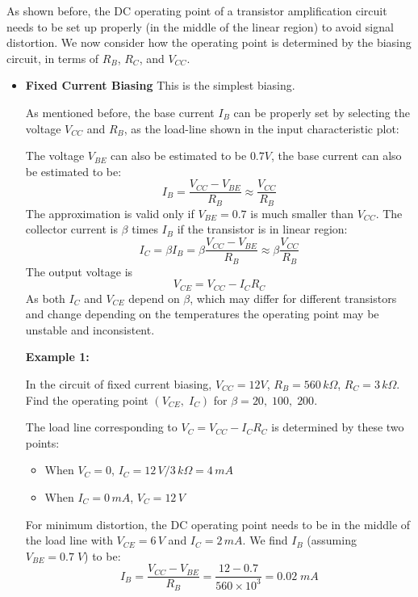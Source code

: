 As shown before, the DC operating point of a transistor amplification circuit
needs to be set up properly (in the middle of the linear region) to avoid
signal distortion. We now consider how the operating point is determined by 
the biasing circuit, in terms of $R_B$, $R_C$, and $V_{CC}$.

\begin{itemize}
\item {\bf Fixed Current Biasing} This is the simplest biasing. 


As mentioned before, the base current $I_B$ can be properly set by selecting
the voltage $V_{CC}$ and $R_B$, as the load-line shown in the input 
characteristic plot: 


The voltage $V_{BE}$ can also be estimated to be $0.7V$, the base current can 
also be estimated to be:
\[
I_B=\frac{V_{CC}-V_{BE}}{R_B} \approx \frac{V_{CC}}{R_B}	
\]
The approximation is valid only if $V_{BE}=0.7$ is much smaller than $V_{CC}$.
The collector current is $\beta$ times $I_B$ if the transistor is in linear
region:
\[
I_C=\beta I_B=\beta \frac{V_{CC}-V_{BE}}{R_B} \approx \beta \frac{V_{CC}}{R_B}
\]
The output voltage is 
\[
V_{CE}=V_{CC}-I_C R_C	
\]
As both $I_C$ and $V_{CE}$ depend on $\beta$, which may differ for different
transistors and change depending on the temperatures the operating point may
be unstable and inconsistent. 

{\bf Example 1:} 

In the circuit of fixed current biasing, $V_{CC}=12V$, $R_B=560\,k\Omega$, 
$R_C=3\,k\Omega$. Find the operating point $(V_{CE},\;I_C)$ for $\beta=20,
\;100,\; 200$.

The load line corresponding to $V_C=V_{CC}-I_C R_C$ is determined by these
two points:
\begin{itemize}
\item When $V_C=0$, $I_C=12\,V/3\,k\Omega=4\,mA$ 
\item When $I_C=0\,mA$, $V_C=12\,V$
\end{itemize}
For minimum distortion, the DC operating point needs to be in the middle
of the load line with $V_{CE}=6\,V$ and $I_C=2\,mA$. We find $I_B$ (assuming
$V_{BE}=0.7\;V$) to be:
\[ 
I_B=\frac{V_{CC}-V_{BE}}{R_B}=\frac{12-0.7}{560\times 10^3}=0.02 \;mA 
\]

\begin{itemize}


\end{itemize}
\end{itemize}
